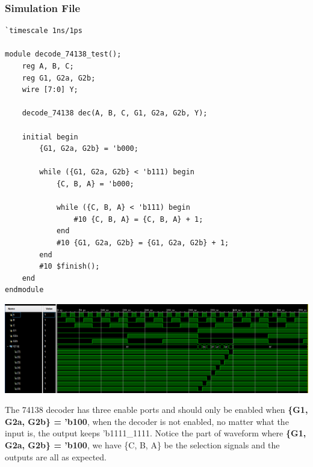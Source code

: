 \documentclass[onecolumn, oneside, ctexart]{SUSTechHomework}
\begin{document}
\subsubsection*{Simulation File}
\begin{lstlisting}
`timescale 1ns/1ps

module decode_74138_test();
    reg A, B, C;
    reg G1, G2a, G2b;
    wire [7:0] Y;

    decode_74138 dec(A, B, C, G1, G2a, G2b, Y);

    initial begin
        {G1, G2a, G2b} = 'b000;

        while ({G1, G2a, G2b} < 'b111) begin
            {C, B, A} = 'b000;

            while ({C, B, A} < 'b111) begin
                #10 {C, B, A} = {C, B, A} + 1;
            end
            #10 {G1, G2a, G2b} = {G1, G2a, G2b} + 1;
        end
        #10 $finish();
    end
endmodule
\end{lstlisting}
\vspace{-2em}
\centerline{\includegraphics[width=\textwidth]{fig/t1}}
\par The 74138 decoder has three enable ports and should only be enabled when \textbf{\{G1, G2a, G2b\} = 'b100}, when the decoder is not enabled, no matter what the input is, the output keeps 'b1111\_1111. Notice the part of waveform where \textbf{\{G1, G2a, G2b\} = 'b100}, we have \{C, B, A\} be the selection signals and the outputs are all as expected.\\
\end{document}
